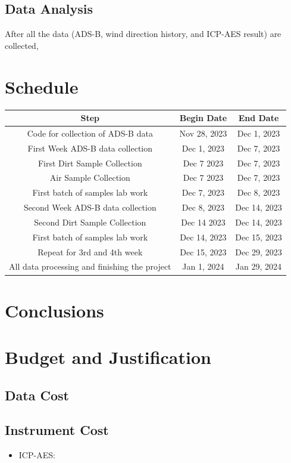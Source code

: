 \documentclass[12pt]{article}
\begin{document}
\subsection{Data Analysis}
After all the data (ADS-B, wind direction history, and ICP-AES result) are collected, 
\section{Schedule}
\begin{center}
\begin{tabular}{|c|c|c|}
 \hline
 \textbf{Step} & \textbf{Begin Date} & \textbf{End Date} \\
 \hline \hline
Code for collection of ADS-B data & Nov 28, 2023 & Dec 1, 2023 \\
\hline
First Week ADS-B data collection & Dec 1, 2023 & Dec 7, 2023 \\
\hline
First Dirt Sample Collection & Dec 7 2023 & Dec 7, 2023 \\
\hline
Air Sample Collection & Dec 7 2023 & Dec 7, 2023 \\
\hline
First batch of samples lab work & Dec 7, 2023 & Dec 8, 2023 \\ 
\hline
Second Week ADS-B data collection & Dec 8, 2023 & Dec 14, 2023 \\
\hline
Second Dirt Sample Collection & Dec 14 2023 & Dec 14, 2023 \\
\hline
First batch of samples lab work & Dec 14, 2023 & Dec 15, 2023 \\ 
\hline
Repeat for 3rd and 4th week & Dec 15, 2023 & Dec 29, 2023\\
\hline
All data processing and finishing the project& Jan 1, 2024 & Jan 29, 2024\\
\hline
\end{tabular}
\end{center}
\section{Conclusions}
\section{Budget and Justification}
\subsection{Data Cost}

\subsection{Instrument Cost}
\begin{itemize}
    \item ICP-AES: 
\end{itemize}

\newpage
\printbibliography
\end{document}
